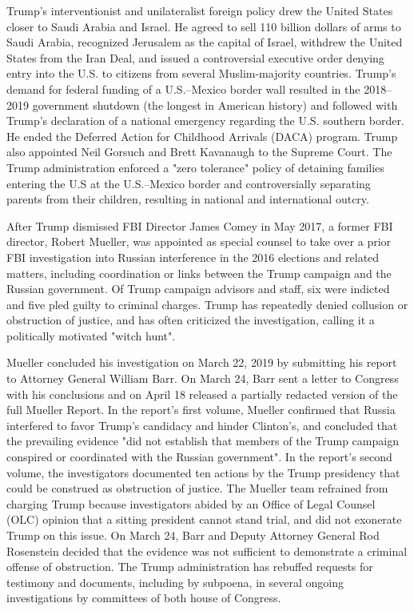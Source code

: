 Trump's interventionist and unilateralist foreign policy drew the United
States closer to Saudi Arabia and Israel. He agreed to sell 110 billion
dollars of arms to Saudi Arabia, recognized Jerusalem as the capital of
Israel, withdrew the United States from the Iran Deal, and issued a
controversial executive order denying entry into the U.S. to citizens
from several Muslim-majority countries. Trump's demand for federal
funding of a U.S.--Mexico border wall resulted in the 2018--2019
government shutdown (the longest in American history) and followed with
Trump's declaration of a national emergency regarding the U.S. southern
border. He ended the Deferred Action for Childhood Arrivals (DACA)
program. Trump also appointed Neil Gorsuch and Brett Kavanaugh to the
Supreme Court. The Trump administration enforced a "zero tolerance"
policy of detaining families entering the U.S at the U.S.--Mexico border
and controversially separating parents from their children, resulting in
national and international outcry.

After Trump dismissed FBI Director James Comey in May 2017, a former FBI
director, Robert Mueller, was appointed as special counsel to take over
a prior FBI investigation into Russian interference in the 2016
elections and related matters, including coordination or links between
the Trump campaign and the Russian government. Of Trump campaign
advisors and staff, six were indicted and five pled guilty to criminal
charges. Trump has repeatedly denied collusion or obstruction of
justice, and has often criticized the investigation, calling it a
politically motivated "witch hunt".

Mueller concluded his investigation on March 22, 2019 by submitting his
report to Attorney General William Barr. On March 24, Barr sent a letter
to Congress with his conclusions and on April 18 released a partially
redacted version of the full Mueller Report. In the report's first
volume, Mueller confirmed that Russia interfered to favor Trump's
candidacy and hinder Clinton's, and concluded that the prevailing
evidence "did not establish that members of the Trump campaign conspired
or coordinated with the Russian government". In the report's second
volume, the investigators documented ten actions by the Trump presidency
that could be construed as obstruction of justice. The Mueller team
refrained from charging Trump because investigators abided by an Office
of Legal Counsel (OLC) opinion that a sitting president cannot stand
trial, and did not exonerate Trump on this issue. On March 24, Barr and
Deputy Attorney General Rod Rosenstein decided that the evidence was not
sufficient to demonstrate a criminal offense of obstruction. The Trump
administration has rebuffed requests for testimony and documents,
including by subpoena, in several ongoing investigations by committees
of both house of Congress.

